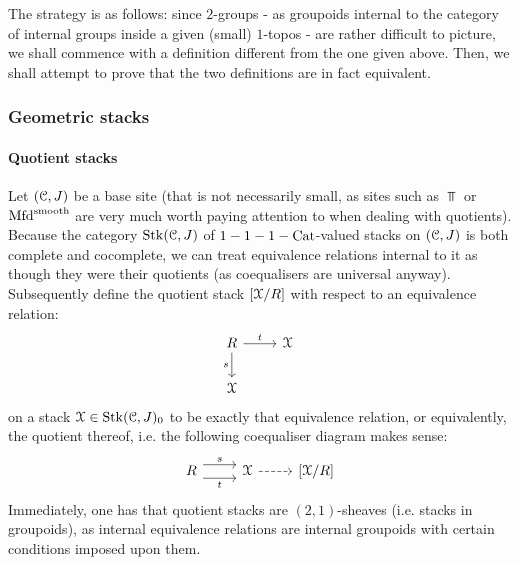                     The strategy is as follows: since $2$-groups - as groupoids internal to the category of internal groups inside a given (small) $1$-topos - are rather difficult to picture, we shall commence with a definition different from the one given above. Then, we shall attempt to prove that the two definitions are in fact equivalent.
                    
                    
                 
             \subsubsection{Geometric stacks}   
                \paragraph{Quotient stacks}
                    \begin{definition} \label{def: quotient_stacks} 
                        Let $(\mathcal{C}, J)$ be a base site (that is not necessarily small, as sites such as $\Top$ or $\mathrm{Mfd}^{\mathrm{smooth}}$ are very much worth paying attention to when dealing with quotients). Because the category $\mathrm{Stk}(\mathcal{C}, J)$ of $1-1-1-\mathrm{Cat}$-valued stacks on $(\mathcal{C}, J)$ is both complete and cocomplete, we can treat equivalence relations internal to it as though they were their quotients (as coequalisers are universal anyway). Subsequently define the quotient stack $[\mathcal{X}/R]$ with respect to an equivalence relation:
                            $$
                                \begin{tikzcd}
                                	R & \calX \\
                                	\calX
                                	\arrow["s"', from=1-1, to=2-1]
                                	\arrow["t", from=1-1, to=1-2]
                                \end{tikzcd}
                            $$
                        on a stack $\mathcal{X} \in \mathrm{Stk}(\mathcal{C}, J)_0$ to be exactly that equivalence relation, or equivalently, the quotient thereof, i.e. the following coequaliser diagram makes sense:
                            $$
                                \begin{tikzcd}
                                	R & \calX & {[\calX/R]}
                                	\arrow["s", shift left=2, from=1-1, to=1-2]
                                	\arrow["t"', shift right=2, from=1-1, to=1-2]
                                	\arrow[dashed, from=1-2, to=1-3]
                                \end{tikzcd}
                            $$
                        Immediately, one has that quotient stacks are $(2,1)$-sheaves (i.e. stacks in groupoids), as internal equivalence relations are internal groupoids with certain conditions imposed upon them. 
                    \end{definition}
                    
